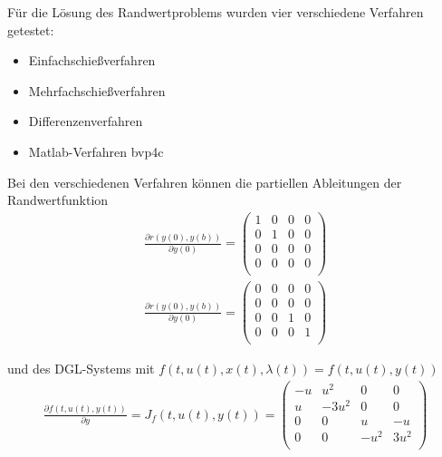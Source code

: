 Für die Lösung des Randwertproblems wurden vier verschiedene Verfahren getestet:
\begin{itemize}
	\item Einfachschießverfahren
	\item Mehrfachschießverfahren 
	\item Differenzenverfahren
	\item Matlab-Verfahren bvp4c
\end{itemize}
Bei den verschiedenen Verfahren können die partiellen Ableitungen der Randwertfunktion
\begin{align}
	\frac{\partial r(y(0),y(b)) }{\partial y(0)}= \left(\begin{array}{cccc}
													1&0&0&0\\
													0&1&0&0\\
													0&0&0&0\\
													0&0&0&0\\
										\end{array}\right)\label{eq:dra}\\
	\frac{\partial r(y(0),y(b)) }{\partial  y(0)}= \left(\begin{array}{cccc}
		0&0&0&0\\
		0&0&0&0\\
		0&0&1&0\\
		0&0&0&1\\
	\end{array}\right) \label{eq:drb}
\end{align}

und des DGL-Systems mit $f(t,u(t),x(t),\lambda(t)) = f(t,u(t),y(t))$
\begin{align}
	\frac{\partial f(t,u(t),y(t))}{\partial y} = J_f(t,u(t),y(t)) = \left(\begin{array}{cccc}
																																	-u&u^2&0&0\\
																																	u&-3u^2&0&0\\
																																	0&0&u&-u\\
																																	0&0&-u^2&3u^2\\
																																\end{array}\right)\label{eq:df}			
\end{align}

